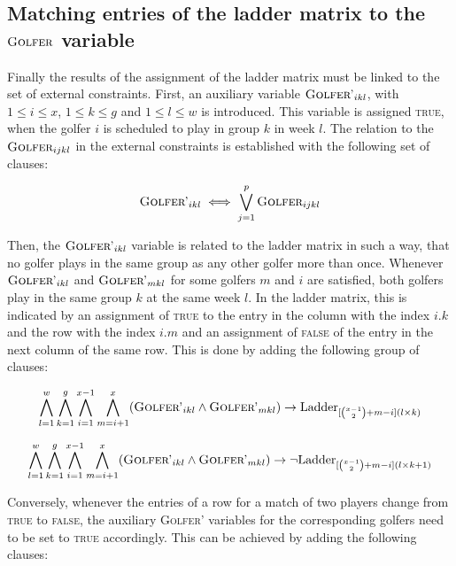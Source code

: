 \documentclass[a4paper]{scrartcl}
\begin{document}
\subsection{Matching entries of the ladder matrix to the $\textsc{Golfer}$ variable}

Finally the results of the assignment of the ladder matrix must be linked to the set of external constraints. First, an auxiliary variable $\textsc{Golfer'}_{ikl}$, with $1 \leq i \leq x$, $1 \leq k \leq g$ and $1 \leq l \leq w$ is introduced. This variable is assigned \textsc{true}, when the golfer $i$ is scheduled to play in group $k$ in week $l$. The relation to the $\textsc{Golfer}_{ijkl}$ in the external constraints is established with the following set of clauses:

\begin{equation}
    \textsc{Golfer'}_{ikl} \iff \bigvee \limits_{j=1}^p \textsc{Golfer}_{ijkl}
\end{equation}

Then, the $\textsc{Golfer'}_{ikl}$ variable is related to the ladder matrix in such a way, that no golfer plays in the same group as any other golfer more than once. Whenever $\textsc{Golfer'}_{ikl}$ and $\textsc{Golfer'}_{mkl}$ for some golfers $m$ and $i$ are satisfied, both golfers play in the same group $k$ at the same week $l$. In the ladder matrix, this is indicated by an assignment of \textsc{true} to the entry in the column with the index $i.k$ and the row with the index $i.m$ and an assignment of \textsc{false} of the entry in the next column of the same row. This is done by adding the following group of clauses:

\begin{equation}
\centering
    \bigwedge \limits_{l=1}^{w}
    \bigwedge \limits_{k=1}^{g}
    \bigwedge \limits_{i=1}^{x-1}
    \bigwedge \limits_{m=i+1}^{x}
    (\textsc{Golfer'}_{ikl} \wedge \textsc{Golfer'}_{mkl}) \to \text{Ladder}_{[{x-1 \choose 2}+m-i](l \times k)}
\end{equation}

\begin{equation}
\centering
    \bigwedge \limits_{l=1}^{w}
    \bigwedge \limits_{k=1}^{g}
    \bigwedge \limits_{i=1}^{x-1}
    \bigwedge \limits_{m=i+1}^{x}
    (\textsc{Golfer'}_{ikl} \wedge \textsc{Golfer'}_{mkl}) \to \neg \text{Ladder}_{[{x-1 \choose 2}+m-i](l \times k + 1)}
\end{equation}

Conversely, whenever the entries of a row for a match of two players change from \textsc{true} to \textsc{false}, the auxiliary \textsc{Golfer'} variables for the corresponding golfers need to be set to \textsc{true} accordingly. This can be achieved by adding the following clauses:
\end{document}
